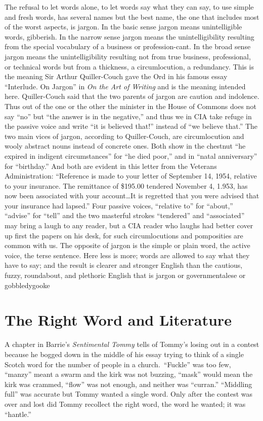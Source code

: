 \documentclass[
    oneside,
    11pt,
]{memoir}
\begin{document}
The refusal to let words alone, to let words say what they can say, to use simple and fresh words, has several names but the best name, the one that includes most of the worst aspects, is jargon. In the basic sense jargon means unintelligible words, gibberish. In the narrow sense jargon means the unintelligibility resulting from the special vocabulary of a business or profession-cant. In the broad sense jargon means the unintelligibility resulting not from true business, professional, or technical words but from a thickness, a circumlocution, a redundancy. This is the meaning Sir Arthur Quiller-Couch gave the Ord in his famous essay \enquote{Interlude. On Jargon} in \emph{On the Art of Writing} and is the meaning intended here. Quiller-Couch said that the two parents of jargon are caution and indolence. Thus out of the one or the other the minister in the House of Commons does not say \enquote{no} but \enquote{the answer is in the negative,} and thus we in CIA take refuge in the passive voice and write \enquote{it is believed that!} instead of \enquote{we believe that.} The two main vices of jargon, according to Quiller-Couch, are circumlocution and wooly abstract nouns instead of concrete ones. Both show in the chestnut \enquote{he expired in indigent circumstances} for \enquote{he died poor,} and in \enquote{natal anniversary} for \enquote{birthday.} And both are evident in this letter from the Veterans Administration: \enquote{Reference is made to your letter of September 14, 1954, relative to your insurance. The remittance of \$195.00 tendered November 4, 1.953, has now been associated with your account\dots It is regretted that you were advised that your insurance had lapsed.} Four passive voices, \enquote{relative to} for \enquote{about,} \enquote{advise} for \enquote{tell} and the two masterful strokes \enquote{tendered} and \enquote{associated} may bring a laugh to any reader, but a CIA reader who laughs had better cover up first the papers on his desk, for such circumlocutions and pomposities are common with us. The opposite of jargon is the simple or plain word, the active voice, the terse sentence. Here less is more; words are allowed to say what they have to say; and the result is clearer and stronger English than the cautious, fuzzy, roundabout, and plethoric English that is jargon or governmentalese or gobbledygooke

\chapter{The Right Word and Literature}
A chapter in Barrie's \emph{Sentimental Tommy} tells of Tommy's losing out in a contest because he bogged down in the middle of his essay trying to think of a single Scotch word for the number of people in a church.\ \enquote{Fuckle} was too few, \enquote{manzy} meant a swarm and the kirk was not buzzing, \enquote{mask} would mean the kirk was crammed, \enquote{flow} was not enough, and neither was \enquote{curran.} \enquote{Middling full} was accurate but Tommy wanted a single word. Only after the contest was over and lost did Tommy recollect the right word, the word he wanted; it was \enquote{hantle.}
\end{document}
